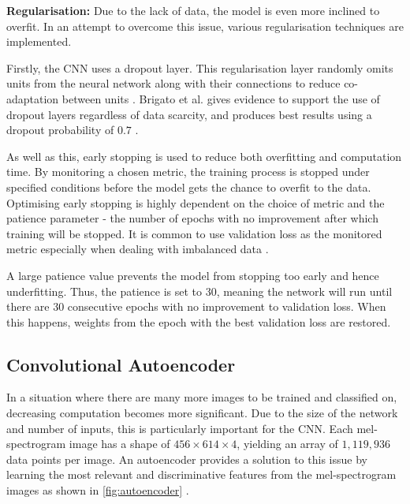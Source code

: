 \documentclass[conference]{IEEEtran}
\begin{document}
\noindent \textbf{Regularisation:} \newline 
Due to the lack of data, the model is even more inclined to overfit. In an attempt to overcome this issue, various regularisation techniques are implemented.

Firstly, the CNN uses a dropout layer. This regularisation layer randomly omits units from the neural network along with their connections to reduce co-adaptation between units \cite{Dropout}. Brigato et al. gives evidence to support the use of dropout layers regardless of data scarcity, and produces best results using a dropout probability of $0.7$ \cite{SmallData}.

As well as this, early stopping is used to reduce both overfitting and computation time. By monitoring a chosen metric, the training process is stopped under specified conditions before the model gets the chance to overfit to the data. Optimising early stopping is highly dependent on the choice of metric and the patience parameter - the number of epochs with no improvement after which training will be stopped. It is common to use validation loss as the monitored metric especially when dealing with imbalanced data \cite{EarlyStopping}.

A large patience value prevents the model from stopping too early and hence underfitting. Thus, the patience is set to 30, meaning the network will run until there are 30 consecutive epochs with no improvement to validation loss. When this happens, weights from the epoch with the best validation loss are restored.


\subsection{Convolutional Autoencoder}

In a situation where there are many more images to be trained and classified on, decreasing computation becomes more significant. Due to the size of the network and number of inputs, this is particularly important for the CNN. Each mel-spectrogram image has a shape of $456\times614\times4$, yielding an array of $1,119,936$ data points per image. An autoencoder provides a solution to this issue by learning the most relevant and discriminative features from the mel-spectrogram images as shown in \autoref{fig:autoencoder} \cite{sardari2022audio}.
\end{document}
